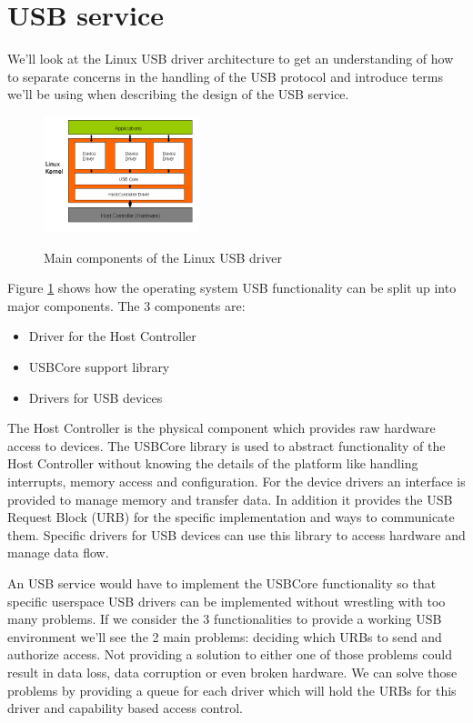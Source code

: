 \documentclass{acm_proc_article-sp}
\begin{document}
\section{USB service}
\label{sec:serv}
We'll look at the Linux USB driver architecture to get an understanding of how to separate concerns
in the handling of the USB protocol and introduce terms we'll be using when describing the design
of the USB service.
\begin{figure}
\centering
\includegraphics[width=0.4\textwidth]{usblinux.png}
\label{fig:usblinux}
\caption{Main components of the Linux USB driver}
\end{figure}
Figure \ref{fig:usblinux} shows how the operating system USB functionality can be split up into
major components.
The 3 components are:
\begin{itemize}
\item Driver for the Host Controller
\item USBCore support library
\item Drivers for USB devices
\end{itemize}
The Host Controller is the physical component which provides raw hardware access to devices.
The USBCore library is used to abstract functionality of the Host Controller without knowing
the details of the platform like handling interrupts, memory access and configuration.
For the device drivers an interface is provided to manage memory and transfer data.
In addition it provides the USB Request Block (URB) for the specific implementation and ways
to communicate them.
Specific drivers for USB devices can use this library to access hardware and manage data flow.

An USB service would have to implement the USBCore functionality so that specific userspace
USB drivers can be implemented without wrestling with too many problems.
If we consider the 3 functionalities to provide a working USB environment we'll see the 2
main problems: deciding which URBs to send and authorize access.
Not providing a solution to either one of those problems could result in data loss,
data corruption or even broken hardware.
We can solve those problems by providing a queue for each driver which will hold the URBs
for this driver and capability based access control.
\end{document}
